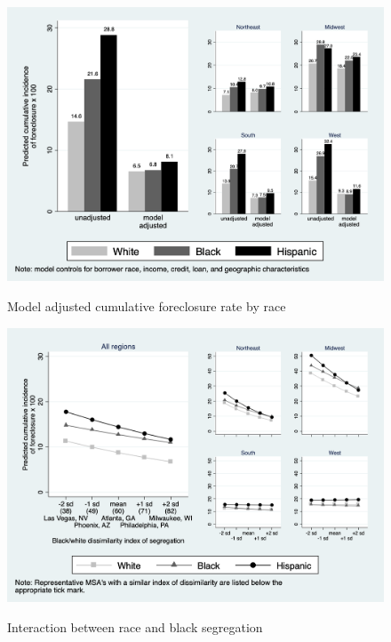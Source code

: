 \documentclass[12pt]{article}
\begin{document}
\clearpage
\begin{figure}[htp!]
\centering
\caption{Model adjusted cumulative foreclosure rate by race}
\includegraphics[scale=.75]{../graphs/predict_basecif_center_race_region}
\label{predict_basecif_race_policy}
\end{figure}

\begin{figure}[htp!]
\centering
\caption{Interaction between race and black segregation}
\centering
\includegraphics[scale=.75]{../graphs/predict_basecif_segregation_center_race_region}
\label{predict_basecif_segregation}
\end{figure}
\end{document}
